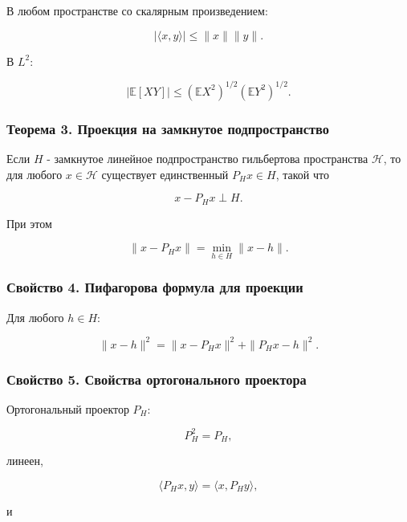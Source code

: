 \documentclass[
  11pt,
  a4paper,
]{article}
\begin{document}
В любом пространстве со скалярным произведением:

\[
|\langle x,y\rangle|
\le
\|x\|\|y\|.
\]

В \(L^2\):

\[
|\mathbb E[XY]|
\le
(\mathbb EX^2)^{1/2}(\mathbb EY^2)^{1/2}.
\]

\subsubsection{Теорема 3. Проекция на замкнутое
подпространство}\label{ux442ux435ux43eux440ux435ux43cux430-3.-ux43fux440ux43eux435ux43aux446ux438ux44f-ux43dux430-ux437ux430ux43cux43aux43dux443ux442ux43eux435-ux43fux43eux434ux43fux440ux43eux441ux442ux440ux430ux43dux441ux442ux432ux43e}

Если \(H\) - замкнутое линейное подпространство гильбертова пространства
\(\mathcal H\), то для любого \(x\in\mathcal H\) существует единственный
\(P_Hx\in H\), такой что

\[
x-P_Hx\perp H.
\]

При этом

\[
\|x-P_Hx\|
=
\min_{h\in H}\|x-h\|.
\]

\subsubsection{Свойство 4. Пифагорова формула для
проекции}\label{ux441ux432ux43eux439ux441ux442ux432ux43e-4.-ux43fux438ux444ux430ux433ux43eux440ux43eux432ux430-ux444ux43eux440ux43cux443ux43bux430-ux434ux43bux44f-ux43fux440ux43eux435ux43aux446ux438ux438}

Для любого \(h\in H\):

\[
\|x-h\|^2
=
\|x-P_Hx\|^2+\|P_Hx-h\|^2.
\]

\subsubsection{Свойство 5. Свойства ортогонального
проектора}\label{ux441ux432ux43eux439ux441ux442ux432ux43e-5.-ux441ux432ux43eux439ux441ux442ux432ux430-ux43eux440ux442ux43eux433ux43eux43dux430ux43bux44cux43dux43eux433ux43e-ux43fux440ux43eux435ux43aux442ux43eux440ux430}

Ортогональный проектор \(P_H\):

\[
P_H^2=P_H,
\]

линеен,

\[
\langle P_Hx,y\rangle=\langle x,P_Hy\rangle,
\]

и
\end{document}

